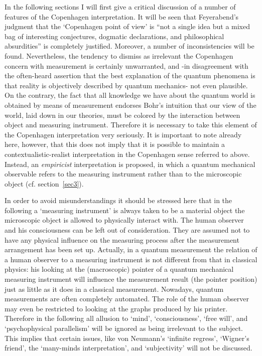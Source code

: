 \documentclass[12pt]{article}
\begin{document}
In the following sections I will first give a critical discussion
of a number of features of the Copenhagen interpretation. It will
be seen that Feyerabend's \cite{Feyerabend68} judgment that the
`Copenhagen point of view' is ``not a single idea but a mixed bag
of interesting conjectures, dogmatic declarations, and
philosophical absurdities'' is completely justified. Moreover, a
number of inconsistencies will be found. Nevertheless, the
tendency to dismiss as irrelevant the Copenhagen concern with
measurement is certainly unwarranted, and -in disagreement with
the often-heard assertion that the best explanation of the quantum
phenomena is that reality is objectively described by quantum
mechanics- not even plausible. On the contrary, the fact that all
knowledge we have about the quantum world is obtained by means of
measurement endorses Bohr's intuition that our view of the world,
laid down in our theories, must be colored by the interaction
between object and measuring instrument. Therefore it is necessary
to take this element of the Copenhagen interpretation very
seriously. It is important to note already here, however, that
this does not imply that it is possible to maintain a
contextualistic-realist interpretation in the Copenhagen sense
referred to above. Instead, an {\em empiricist} interpretation is
proposed, in which a quantum mechanical observable refers to the
measuring instrument rather than to the microscopic object (cf.
section~\ref{sec3}).

In order to avoid misunderstandings it should be stressed here
that in the following a `measuring instrument' is always taken to
be a material object the microscopic object is allowed to
physically interact with. The human observer and his consciousness
can be left out of consideration. They are assumed not to have any
physical influence on the measuring process after the measurement
arrangement has been set up. Actually, in a quantum measurement
the relation of a human observer to a measuring instrument is not
different from that in classical physics: his looking at the
(macroscopic) pointer of a quantum mechanical measuring instrument
will influence the measurement result (the pointer position) just
as little as it does in a classical measurement. Nowadays, quantum
measurements are often completely automated. The role of the human
observer may even be restricted to looking at the graphs produced
by his printer. Therefore in the following all allusion to `mind',
`consciousness', `free will', and `psychophysical parallelism'
will be ignored as being irrelevant to the subject. This implies
that certain issues, like von Neumann's `infinite regress',
`Wigner's friend', the `many-minds interpretation', and
`subjectivity' will not be discussed.
\end{document}
